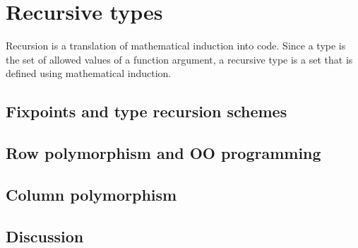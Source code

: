 
\chapter{Recursive types\label{chap:Recursive-types}}

Recursion is a translation of mathematical induction into code. Since
a type is the set of allowed values of a function argument, a recursive
type is a set that is defined using mathematical induction.

\section{Fixpoints and type recursion schemes}

\section{Row polymorphism and OO programming}

\section{Column polymorphism}

\section{Discussion}

\begin{comment}
\end{comment}

